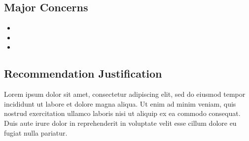 \subsection{Major Concerns}
\begin{itemize}
    \item {}
    \item {}
    \item {}
\end{itemize}

\subsection{Recommendation Justification}
Lorem ipsum dolor sit amet, consectetur adipiscing elit, sed do eiusmod tempor incididunt ut labore et dolore magna aliqua. Ut enim ad minim veniam, quis nostrud exercitation ullamco laboris nisi ut aliquip ex ea commodo consequat. Duis aute irure dolor in reprehenderit in voluptate velit esse cillum dolore eu fugiat nulla pariatur.